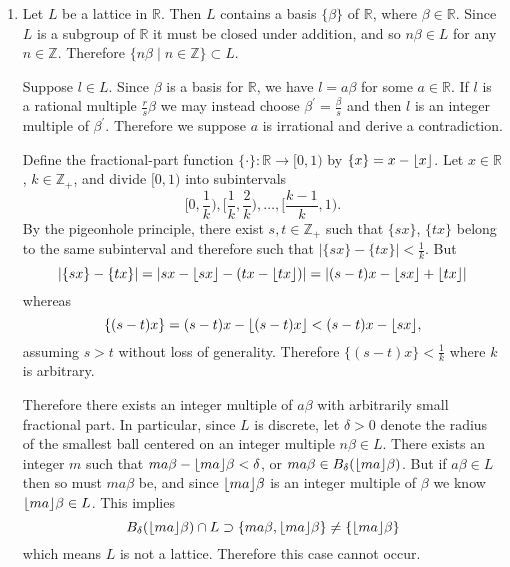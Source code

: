 \documentclass{article}
\DeclarePairedDelimiter\floor{\lfloor}{\rfloor}
\begin{document}
\begin{Answer}
  \begin{enumerate}
    \item{

      Let $L$ be a lattice in $\mathbb{R}$. Then $L$ contains a basis
      $\{ \beta \}$ of $\mathbb{R}$, where $\beta \in
      \mathbb{R}$. Since $L$ is a subgroup of $\mathbb{R}$ it must be
      closed under addition, and so $n \beta \in L$ for any $n \in \mathbb{Z}$.
      Therefore $\{ n \beta \mid n \in \mathbb{Z} \} \subset L$.

      Suppose $l \in L$. Since $\beta$ is a basis for $\mathbb{R}$, we
      have $l = a \beta$ for some $a \in \mathbb{R}$. If $l$ is a
      rational multiple $\frac{r}{s}\beta$ we may
      instead choose $\beta^\prime = \frac{\beta}{s}$ and then $l$ is
      an integer multiple of $\beta^\prime$. Therefore we suppose
      $a$ is irrational and derive a contradiction.

      Define the fractional-part function $\{ \cdot \} : \mathbb{R}
      \to [0,1)$ by $\{ x \} = x - \floor{x}$.
      Let $x \in \mathbb{R}$,
      $k \in \mathbb{Z}_+$, and divide $[0,1)$ into subintervals
      $$
      [0, \frac{1}{k}),
      [\frac{1}{k}, \frac{2}{k}),
      \dots,
      [\frac{k-1}{k}, 1).
      $$
      By the pigeonhole principle, there exist $s, t \in \mathbb{Z}_+$
      such that $\{ s x \}$, $\{ t x \}$ belong to the same
      subinterval and therefore such that
      $|\{ s x \} - \{t x\}| < \frac{1}{k}$. But
      $$
      |\{ s x \} - \{t x\}|
        = |s x - \floor{s x} - (tx - \floor{t x})|
        = |(s - t)x - \floor{s x} + \floor{t x}|
      $$
      whereas
      $$
      \{ (s - t)x \}
        = (s - t)x - \floor{(s - t)x}
        < (s - t)x - \floor{s x},
      $$
      assuming $s > t$ without loss of generality. Therefore
      $\{ (s - t)x \} < \frac{1}{k}$ where $k$ is arbitrary.

      Therefore there exists an integer multiple of $a \beta$ with arbitrarily
      small fractional part.
      In particular, since $L$ is discrete, let $\delta > 0$ denote the radius of the
      smallest ball centered on an integer multiple $n \beta \in L$.
      There exists an integer $m$ such that
      $m a \beta - \floor{m a} \beta < \delta$, or
      $m a \beta \in B_{\delta}(\floor{m a} \beta)$.
      But if $a \beta \in L$ then so must $m a \beta$ be,
      and since $\floor{m a} \beta$ is an integer multiple of $\beta$
      we know $\floor{m a} \beta \in L$. This implies
      $$
      B_{\delta}(\floor{m a} \beta) \cap L \supset \{ m a \beta,
      \floor{m a} \beta \} \neq \{ \floor{m a} \beta \}
      $$
      which means $L$ is not a lattice. Therefore this case cannot occur.

}
\end{enumerate}
\end{Answer}
\end{document}
